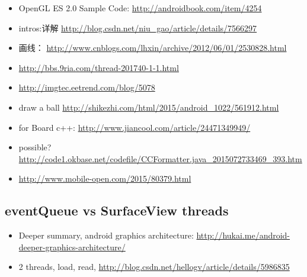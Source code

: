 \documentclass[9pt,b5paper]{article}
\begin{document}
\begin{itemize}
\item OpenGL ES 2.0 Sample Code: \url{http://androidbook.com/item/4254}
\item intros:详解 \url{http://blog.csdn.net/niu_gao/article/details/7566297}
\item 画线： \url{http://www.cnblogs.com/lhxin/archive/2012/06/01/2530828.html}
\item \url{http://bbs.9ria.com/thread-201740-1-1.html}
\item \url{http://imgtec.eetrend.com/blog/5078}
\item draw a ball \url{http://shikezhi.com/html/2015/android_1022/561912.html}
\item for Board c++: \url{http://www.jiancool.com/article/24471349949/}
\item possible? \url{http://code1.okbase.net/codefile/CCFormatter.java_2015072733469_393.htm}
\item \url{http://www.mobile-open.com/2015/80379.html}
\end{itemize}
\subsection{eventQueue vs SurfaceView threads}
\label{sec-2-5}
\begin{itemize}
\item Deeper summary, android graphics architecture: \url{http://hukai.me/android-deeper-graphics-architecture/}
\item 2 threads, load, read, \url{http://blog.csdn.net/hellogv/article/details/5986835}
\end{itemize}
\end{document}
